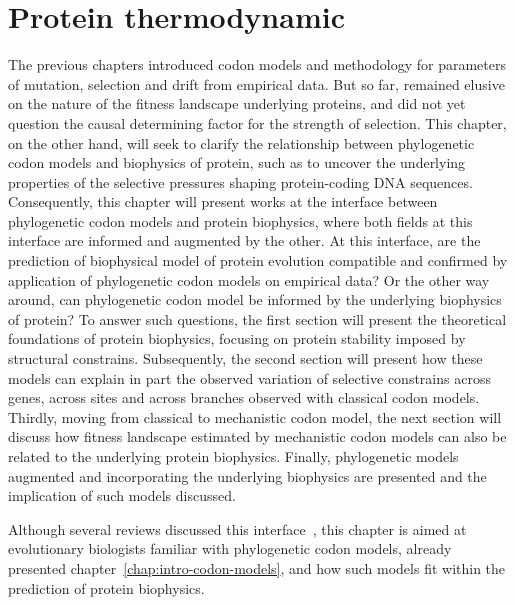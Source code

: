 \chapter{Protein thermodynamic}
{\hypersetup{linkcolor=GREYDARK}\minitoc}
\label{chap:intro-physic-proteins}

The previous chapters introduced codon models and methodology for parameters of mutation, selection and drift from empirical data.
But so far, remained elusive on the nature of the fitness landscape underlying proteins, and did not yet question the causal determining factor for the strength of selection.
This chapter, on the other hand, will seek to clarify the relationship between phylogenetic codon models and biophysics of protein, such as to uncover the underlying properties of the selective pressures shaping protein-coding \acrshort{DNA} sequences.
Consequently, this chapter will present works at the interface between phylogenetic codon models and protein biophysics, where both fields at this interface are informed and augmented by the other. 
At this interface, are the prediction of biophysical model of protein evolution compatible and confirmed by application of phylogenetic codon models on empirical data?
Or the other way around, can phylogenetic codon model be informed by the underlying biophysics of protein?
To answer such questions, the first section will present the theoretical foundations of protein biophysics, focusing on protein stability imposed by structural constrains.
Subsequently, the second section will present how these models can explain in part the observed variation of selective constrains across genes, across sites and across branches observed with classical codon models.
Thirdly, moving from classical to mechanistic codon model, the next section will discuss how fitness landscape estimated by mechanistic codon models can also be related to the underlying protein biophysics.
Finally, phylogenetic models augmented and incorporating the underlying biophysics are presented and the implication of such models discussed.

Although several reviews discussed this interface~\citep{Liberles2012,Serohijos2014,Sikosek2014,Arenas2015,Echave2017,Bastolla2017}, this chapter is aimed at evolutionary biologists familiar with phylogenetic codon models, already presented chapter~\ref{chap:intro-codon-models}, and how such models fit within the prediction of protein biophysics.

